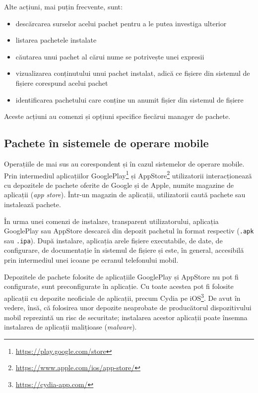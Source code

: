Alte acțiuni, mai puțin frecvente, sunt:
\begin{itemize}
  \item descărcarea surselor acelui pachet pentru a le putea investiga ulterior
  \item listarea pachetele instalate
  \item căutarea unui pachet al cărui nume se potrivește unei expresii
  \item vizualizarea conținutului unui pachet instalat, adică ce fișiere din sistemul de fișiere corespund acelui pachet
  \item identificarea pachetului care conține un anumit fișier din sistemul de fișiere
\end{itemize}
Aceste acțiuni au comenzi și opțiuni specifice fiecărui manager de pachete.

\subsection{Pachete în sistemele de operare mobile}
\label{sec:package:mobile}

Operațiile de mai sus au corespondent și în cazul sistemelor de operare mobile. Prin intermediul aplicațiilor GooglePlay\footnote{\url{https://play.google.com/store}} și AppStore\footnote{\url{https://www.apple.com/ios/app-store/}} utilizatorii interacționează cu depozitele de pachete oferite de Google și de Apple, numite magazine de aplicații (\textit{app store}). Într-un magazin de aplicații, utilizatorii caută pachete sau instalează pachete.

În urma unei comenzi de instalare, transparent utilizatorului, aplicația GooglePlay sau AppStore descarcă din depozit pachetul în format respectiv (\texttt{.apk} sau \texttt{.ipa}). După instalare, aplicația arele fișiere executabile, de date, de configurare, de documentație în sistemul de fișiere și este, în general, accesibilă prin intermediul unei icoane pe ecranul telefonului mobil.

Depozitele de pachete folosite de aplicațiile GooglePlay și AppStore nu pot fi configurate, sunt preconfigurate în aplicație. Cu toate acestea pot fi folosite aplicații cu depozite neoficiale de aplicații, precum Cydia pe iOS\footnote{\url{https://cydia-app.com/}}. De avut în vedere, însă, că folosirea unor depozite neaprobate de producătorul dispozitivului mobil reprezintă un risc de securitate; instalarea acestor aplicații poate însemna instalarea de aplicații malițioase (\textit{malware}).

